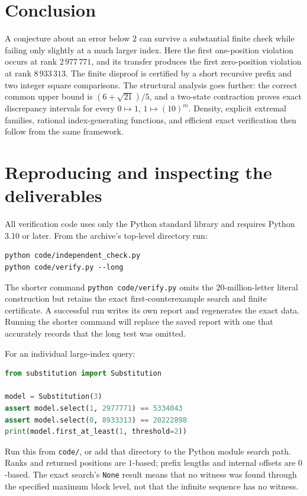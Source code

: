 \documentclass[11pt]{article}
\numberwithin{equation}{section}
\theoremstyle{definition}
\theoremstyle{remark}
\begin{document}
\section{Conclusion}
A conjecture about an error below $2$ can survive a substantial finite
check while failing only slightly at a much larger index. Here the first
one-position violation occurs at rank $2\,977\,771$, and its transfer
produces the first zero-position violation at rank $8\,933\,313$.
The finite disproof is certified by a short recursive prefix and two
integer square comparisons. The structural analysis goes further: the
correct common upper bound is $(6+\sqrt{21})/5$, and a two-state contraction
proves exact discrepancy intervals for every $0\mapsto1$,
$1\mapsto(10)^m$. Density, explicit extremal families, rational
index-generating functions, and efficient exact verification then follow
from the same framework.

\clearpage
\appendix
\section{Reproducing and inspecting the deliverables}\label{app:reproduce}

All verification code uses only the Python standard library and requires
Python 3.10 or later. From the archive's top-level directory run:
\begin{lstlisting}
python code/independent_check.py
python code/verify.py --long
\end{lstlisting}
The shorter command \texttt{python code/verify.py} omits the
$20$-million-letter literal construction but retains the exact
first-counterexample search and finite certificate. A successful run
writes its own report and regenerates the exact data. Running the shorter
command will replace the saved report with one that accurately records
that the long test was omitted.

For an individual large-index query:
\begin{lstlisting}[language=Python]
from substitution import Substitution

model = Substitution(3)
assert model.select(1, 2977771) == 5334043
assert model.select(0, 8933313) == 20222898
print(model.first_at_least(1, threshold=2))
\end{lstlisting}
Run this from \texttt{code/}, or add that directory to the Python module
search path. Ranks and returned positions are $1$-based; prefix lengths
and internal offsets are $0$-based. The exact search's \texttt{None}
result means that no witness was found through the specified maximum
block level, not that the infinite sequence has no witness.
\end{document}
